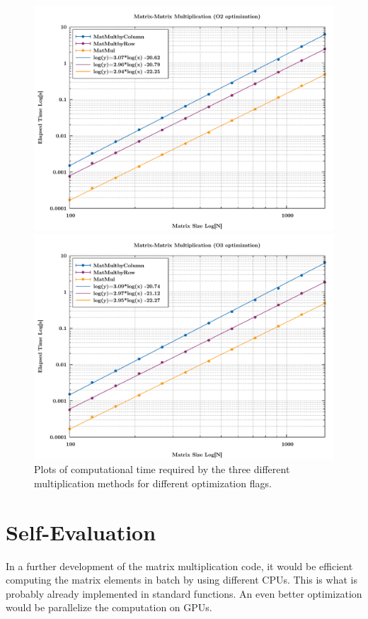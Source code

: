 \documentclass[rmp,10pt,onecolumn,fleqn,notitlepage]{revtex4-1}
\begin{document}
\begin{figure}[t!]
\begin{minipage}[c]{0.49\linewidth}
\includegraphics[width=1\textwidth]{image/matmult_O2.pdf}
\end{minipage}
\begin{minipage}[]{0.5\linewidth}
\centering
\includegraphics[width=1\textwidth]{image/matmult_O3.pdf}
\end{minipage}
\caption{\label{fig:results} Plots of computational time required by the three different multiplication methods for different optimization flags.}
\end{figure}


\section{Self-Evaluation}
In a further development of the matrix multiplication code, it would be efficient computing the matrix elements in batch by using different CPUs. This is what is probably already implemented in standard functions. An even better optimization would be parallelize the computation on GPUs.


%
\end{document}
